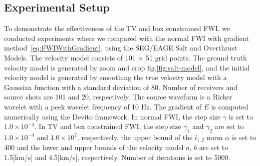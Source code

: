 \subsection{Experimental Setup}\label{subsec:experimental-setup}
%
%
%
To demonstrate the effectiveness of the TV and box constrained FWI, we conducted experiments where we compared with the normal FWI with gradient method~\eqref{eq:FWIWithGradient}, using the SEG/EAGE Salt and Overthrust Models.
The velocity model consists of 101 $\times$ 51 grid points.
The ground truth velocity model is generated by zoom and crop fig.\ref{fig:salt-model}, and the initial velocity model is generated by smoothing the true velocity model with a Gaussian function with a standard deviation of 80.
Number of receivers and source shots are 101 and 20, respectively.
The source waveform is a Ricker wavelet with a peek wavelet frequency of 10 Hz.
The gradient of $E$ is computed numerically using the Devito framework\cite{devito}.
In normal FWI, the step size $\gamma$ is set to $1.0 \times 10^{-4}$.
In TV and box constrained FWI, the step size $\gamma_1$ and $\gamma_2$ are set to $1.0 \times 10^{-4}$ and $1.0 \times 10^2$, respectively, the upper bound of the $l_{1,2}$ norm $\alpha$ is set to 400 and the lower and upper bounds of the velocity model $a$, $b$ are set to 1.5[km/s] and 4.5[km/s], respectively.
Number of iterations is set to 5000.


